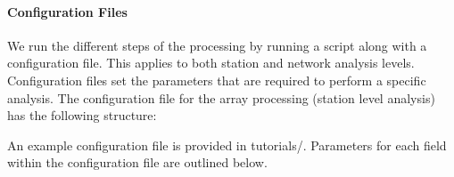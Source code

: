 \documentclass[letterpaper,10pt,english]{sphinxmanual}
\begin{document}
\paragraph{Configuration Files}
\label{\detokenize{config:configuration-files}}\label{\detokenize{config:config}}\label{\detokenize{config::doc}}
We run the different steps of the processing by running a script along with a configuration file. This applies to both station and network analysis levels. Configuration files set the parameters that are required to perform a specific analysis. The configuration file for the array processing (station level analysis) has the following structure:

An example configuration file is provided in tutorials/.  Parameters for each field within the configuration file are outlined below.
\end{document}
